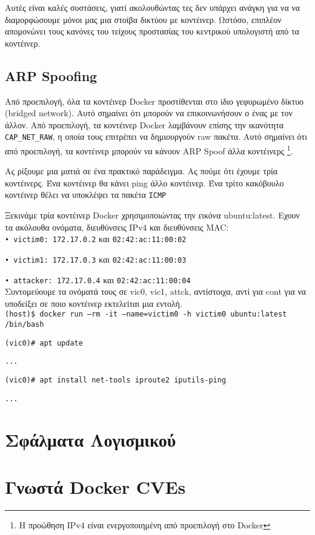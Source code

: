 Αυτές είναι καλές συστάσεις, γιατί ακολουθώντας τες δεν υπάρχει ανάγκη για να
να διαμορφώσουμε μόνοι μας μια στοίβα δικτύου με κοντέινερ. Ωστόσο, επιπλέον
απομονώνει τους κανόνες του τείχους προστασίας του κεντρικού υπολογιστή από τα
κοντέινερ.

\subsection{\textlatin{ARP Spoofing}}

Από προεπιλογή, όλα τα κοντέινερ \textlatin{Docker} προστίθενται στο ίδιο
γεφυρωμένο δίκτυο (\textlatin{bridged network}). Αυτό σημαίνει ότι μπορούν να
επικοινωνήσουν ο ένας με τον άλλον. Από προεπιλογή, τα κοντέινερ
\textlatin{Docker} λαμβάνουν επίσης την ικανότητα
\texttt{\textlatin{CAP\_NET\_RAW}}, η οποία τους επιτρέπει να δημιουργούν \textlatin{raw}
πακέτα. Αυτό σημαίνει ότι από προεπιλογή, τα κοντέινερ μπορούν να
κάνουν \textlatin{ARP Spoof} άλλα κοντέινερς \cite{Abusing-Containers}
\footnote{Η προώθηση \textlatin{IPv4} είναι ενεργοποιημένη από προεπιλογή στο \textlatin{Docker}}.

Ας ρίξουμε μια ματιά σε ένα πρακτικό παράδειγμα. Ας πούμε ότι έχουμε τρία
κοντέινερς. Ένα κοντέινερ θα κάνει \textlatin{ping} άλλο κοντέινερ. Ένα τρίτο
κακόβουλο κοντέινερ θέλει να υποκλέψει τα πακέτα \texttt{\textlatin{ICMP}}

Ξεκινάμε τρία κοντέινερ \textlatin{Docker} χρησιμοποιώντας την εικόνα
\textlatin{ubuntu:latest}. Εχουν τα ακόλουθα ονόματα, διευθύνσεις
\textlatin{IPv4} και διευθύνσεις \textlatin{MAC}: \\

\texttt{\textlatin{• victim0: 172.17.0.2}} και \texttt{\textlatin{02:42:ac:11:00:02}}

\texttt{\textlatin{• victim1: 172.17.0.3}} και \texttt{\textlatin{02:42:ac:11:00:03}}

\texttt{\textlatin{• attacker: 172.17.0.4}} και \texttt{\textlatin{02:42:ac:11:00:04}} \\

Συντομεύουμε τα ονόματά τους σε \textlatin{vic0, vic1, attck}, αντίστοιχα, αντί
για \textlatin{cont} για να υποδείξει σε ποιο κοντέινερ εκτελείται μια εντολή. \\

\texttt{\textlatin{(host)\$ docker run --rm -it --name=victim0 -h victim0 ubuntu:latest /bin/bash}}

\texttt{\textlatin{(vic0)\# apt update}}

\texttt{\textlatin{...}}


\texttt{\textlatin{(vic0)\# apt install net-tools iproute2 iputils-ping}}

\texttt{\textlatin{...}}


\section{Σφάλματα Λογισμικού}
\section{Γνωστά \textlatin{Docker CVEs}}

